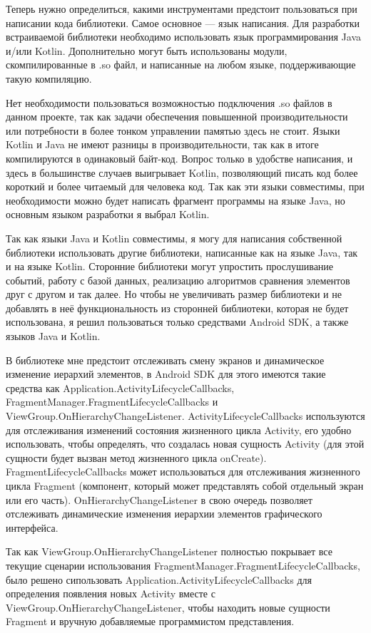 \documentclass[a4paper,14pt]{extarticle} %
\begin{document}
	Теперь нужно определиться, какими инструментами предстоит пользоваться при написании кода библиотеки. Самое основное --- язык написания. Для разработки встраиваемой библиотеки необходимо использовать язык программирования Java и/или Kotlin. Дополнительно могут быть использованы модули, скомпилированные в .so файл, и написанные на любом языке, поддерживающие такую компиляцию. 
	
	Нет необходимости пользоваться возможностью подключения .so файлов в данном проекте, так как задачи обеспечения повышенной производительности или потребности в более тонком управлении памятью здесь не стоит. Языки Kotlin и Java не имеют разницы в производительности, так как в итоге компилируются в одинаковый байт-код. Вопрос только в удобстве написания, и здесь в большинстве случаев выигрывает Kotlin, позволяющий писать код более короткий и более читаемый для человека код. Так как эти языки совместимы, при необходимости можно будет написать фрагмент программы на языке Java, но основным языком разработки я выбрал Kotlin.
	
	Так как языки Java и Kotlin совместимы, я могу для написания собственной библиотеки использовать другие библиотеки, написанные как на языке Java, так и на языке Kotlin. Сторонние библиотеки могут упростить прослушивание событий, работу с базой данных, реализацию алгоритмов сравнения элементов друг с другом и так далее. Но чтобы не увеличивать размер библиотеки и не добавлять в неё функциональность из сторонней библиотеки, которая не будет использована, я решил пользоваться только средствами Android SDK, а также языков Java и Kotlin.
	
	В библиотеке мне предстоит отслеживать смену экранов и динамическое изменение иерархий элементов, в Android SDK для этого имеются такие средства как Application.ActivityLifecycleCallbacks, FragmentManager.FragmentLifecycleCallbacks и ViewGroup.OnHierarchyChangeListener. ActivityLifecycleCallbacks используются для отслеживания изменений состояния жизненного цикла Activity, его удобно использовать, чтобы определять, что создалась новая сущность Activity (для этой сущности будет вызван метод жизненного цикла onCreate). FragmentLifecycleCallbacks может использоваться для отслеживания жизненного цикла Fragment (компонент, который может представлять собой отдельный экран или его часть). OnHierarchyChangeListener в свою очередь позволяет отслеживать динамические изменения иерархии элементов графического интерфейса.
	
	Так как ViewGroup.OnHierarchyChangeListener полностью покрывает все текущие сценарии использования FragmentManager.FragmentLifecycleCallbacks, было решено сипользовать Application.ActivityLifecycleCallbacks для определения появления новых Activity вместе с ViewGroup.OnHierarchyChangeListener, чтобы находить новые сущности Fragment и вручную добавляемые программистом представления.
	
\end{document}
